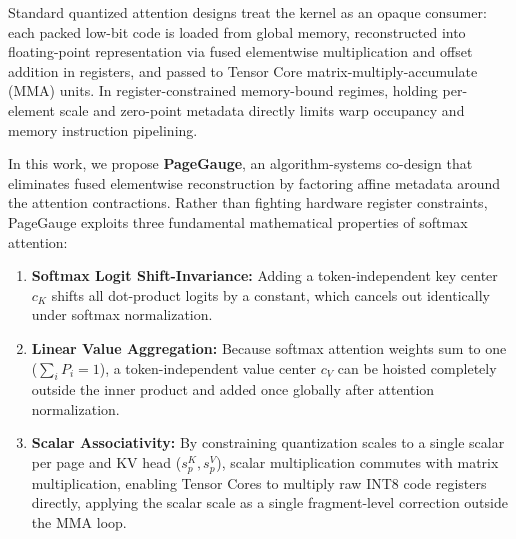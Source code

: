 \documentclass{article}
\begin{document}
Standard quantized attention designs treat the kernel as an opaque consumer: each packed low-bit code is loaded from global memory, reconstructed into floating-point representation via fused elementwise multiplication and offset addition in registers, and passed to Tensor Core matrix-multiply-accumulate (MMA) units. In register-constrained memory-bound regimes, holding per-element scale and zero-point metadata directly limits warp occupancy and memory instruction pipelining.

In this work, we propose \textbf{PageGauge}, an algorithm-systems co-design that eliminates fused elementwise reconstruction by factoring affine metadata around the attention contractions. Rather than fighting hardware register constraints, PageGauge exploits three fundamental mathematical properties of softmax attention:
\begin{enumerate}
    \item \textbf{Softmax Logit Shift-Invariance:} Adding a token-independent key center $c_K$ shifts all dot-product logits by a constant, which cancels out identically under softmax normalization.
    \item \textbf{Linear Value Aggregation:} Because softmax attention weights sum to one ($\sum_i P_i = 1$), a token-independent value center $c_V$ can be hoisted completely outside the inner product and added once globally after attention normalization.
    \item \textbf{Scalar Associativity:} By constraining quantization scales to a single scalar per page and KV head ($s_p^K, s_p^V$), scalar multiplication commutes with matrix multiplication, enabling Tensor Cores to multiply raw INT8 code registers directly, applying the scalar scale as a single fragment-level correction outside the MMA loop.
\end{enumerate}
\end{document}
